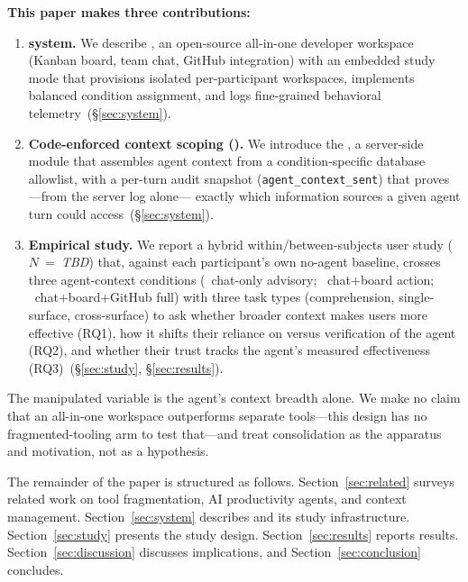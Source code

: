 \textbf{This paper makes three contributions:}
\begin{enumerate}
  \item \textbf{\Weld system.} We describe \Weld, an open-source all-in-one
    developer workspace (Kanban board, team chat, GitHub integration) with an
    embedded study mode that provisions isolated per-participant workspaces,
    implements balanced condition assignment, and logs fine-grained behavioral
    telemetry~(\S\ref{sec:system}).

  \item \textbf{Code-enforced context scoping (\ContextGate).} We introduce the
    \ContextGate, a server-side module that assembles agent context from a
    condition-specific database allowlist, with a per-turn audit snapshot
    (\texttt{agent\_context\_sent}) that proves---from the server log alone---
    exactly which information sources a given agent turn could
    access~(\S\ref{sec:system}).

  \item \textbf{Empirical study.} We report a hybrid within/between-subjects
    user study ($N$~=~\emph{TBD}) that, against each participant's own no-agent
    baseline, crosses three agent-context conditions (\CI\ chat-only advisory;
    \CII\ chat+board action; \CIII\ chat+board+GitHub full) with three task
    types (comprehension, single-surface, cross-surface) to ask whether broader
    context makes users more effective (RQ1), how it shifts their reliance on
    versus verification of the agent (RQ2), and whether their trust tracks the
    agent's measured effectiveness (RQ3)~(\S\ref{sec:study},
    \S\ref{sec:results}).
\end{enumerate}

The manipulated variable is the agent's context breadth alone. We make no claim
that an all-in-one workspace outperforms separate tools---this design has no
fragmented-tooling arm to test that---and treat consolidation as the apparatus
and motivation, not as a hypothesis.

The remainder of the paper is structured as follows.
Section~\ref{sec:related} surveys related work on tool fragmentation, AI
productivity agents, and context management.
Section~\ref{sec:system} describes \Weld and its study infrastructure.
Section~\ref{sec:study} presents the study design.
Section~\ref{sec:results} reports results.
Section~\ref{sec:discussion} discusses implications, and
Section~\ref{sec:conclusion} concludes.
